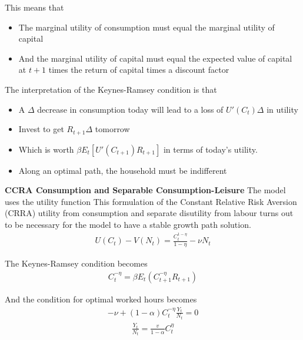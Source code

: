 \documentclass{beamer}
\begin{document}
\begin{frame}
  This means that
\begin{itemize}
  \item The marginal utility of consumption must equal the marginal utility of capital
  \item And the marginal utility of capital must equal the expected value of capital at $t+1$ times the return of capital times a discount factor
\end{itemize}


The interpretation of the Keynes-Ramsey condition is that
\begin{itemize}
  \item A $\Delta$ decrease in consumption today will lead to a loss of $U'(C_t)\Delta$ in utility
  \item Invest to get $R_{t+1}\Delta$ tomorrow
  \item Which is worth $\beta E_t[U'(C_{t+1})R_{t+1}]$ in terms of today's utility.
  \item Along an optimal path, the household must be indifferent
\end{itemize}

\end{frame}

\begin{frame}
  \textbf{CCRA Consumption and Separable Consumption-Leisure}
  The model uses the utility function
  This formulation of the Constant Relative Risk Aversion (CRRA) utility from consumption and separate disutility from labour turns out to be necessary for the model to have a stable growth path solution.
\begin{align}
  U(C_t)-V(N_t)=\frac{C_t^{1-\eta}}{1-\eta}-\nu N_t
\end{align}

The Keynes-Ramsey condition becomes
\begin{align}
  C^{-\eta}_t=\beta E_t(C^{-\eta}_{t+1}R_{t+1})
\end{align}

And the condition for optimal worked hours becomes
\begin{align}
  -\nu +(1-\alpha)C^{-\eta}_t \frac{Y_t}{N_t} = 0
\end{align}
\begin{align}
  \frac{Y_t}{N_t} = \frac{v}{1-\alpha}C_t^{\eta}
\end{align}
\end{frame}
\end{document}
